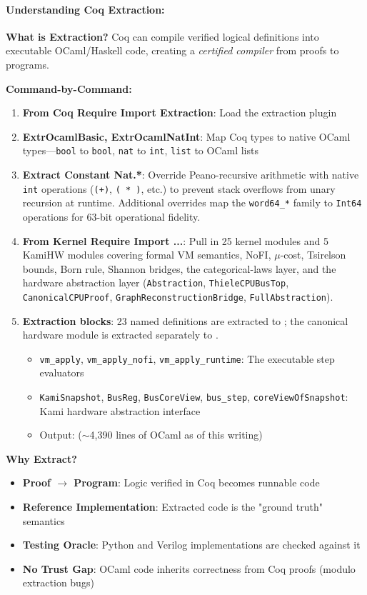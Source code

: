 \paragraph{Understanding Coq Extraction:}
\textbf{What is Extraction?} Coq can compile verified logical definitions into executable OCaml/Haskell code, creating a \emph{certified compiler} from proofs to programs.

\textbf{Command-by-Command:}
\begin{enumerate}
    \item \textbf{From Coq Require Import Extraction}: Load the extraction plugin
    \item \textbf{ExtrOcamlBasic, ExtrOcamlNatInt}: Map Coq types to native OCaml types---\texttt{bool} to \texttt{bool}, \texttt{nat} to \texttt{int}, \texttt{list} to OCaml lists
    \item \textbf{Extract Constant Nat.*}: Override Peano-recursive arithmetic with native \texttt{int} operations (\texttt{(+)}, \texttt{( * )}, etc.) to prevent stack overflows from unary recursion at runtime. Additional overrides map the \texttt{word64\_*} family to \texttt{Int64} operations for 63-bit operational fidelity.
    \item \textbf{From Kernel Require Import ...}: Pull in 25 kernel modules and 5 KamiHW modules covering formal VM semantics, NoFI, $\mu$-cost, Tsirelson bounds, Born rule, Shannon bridges, the categorical-laws layer, and the hardware abstraction layer (\texttt{Abstraction}, \texttt{ThieleCPUBusTop}, \texttt{CanonicalCPUProof}, \texttt{GraphReconstructionBridge}, \texttt{FullAbstraction}).
    \item \textbf{Extraction blocks}: 23 named definitions are extracted to ; the canonical hardware module is extracted separately to .
    \begin{itemize}
        \item \texttt{vm\_apply}, \texttt{vm\_apply\_nofi}, \texttt{vm\_apply\_runtime}: The executable step evaluators
        \item \texttt{KamiSnapshot}, \texttt{BusReg}, \texttt{BusCoreView}, \texttt{bus\_step}, \texttt{coreViewOfSnapshot}: Kami hardware abstraction interface
        \item Output:  ($\sim$4{,}390 lines of OCaml as of this writing)
    \end{itemize}
\end{enumerate}

\textbf{Why Extract?}
\begin{itemize}
    \item \textbf{Proof $\rightarrow$ Program}: Logic verified in Coq becomes runnable code
    \item \textbf{Reference Implementation}: Extracted code is the "ground truth" semantics
    \item \textbf{Testing Oracle}: Python and Verilog implementations are checked against it
    \item \textbf{No Trust Gap}: OCaml code inherits correctness from Coq proofs (modulo extraction bugs)
\end{itemize}

